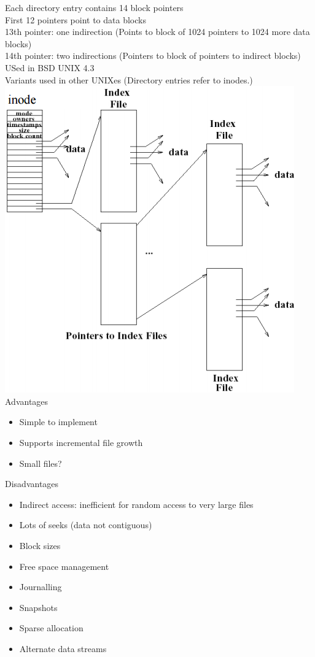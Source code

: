 \documentclass[number]{notes}
\begin{document}
\begin{landscape}
\begin{multicols}{3}
Each directory entry contains 14 block pointers\\
First 12 pointers point to data blocks\\
13th pointer: one indirection (Points to block of 1024 pointers to 1024 more data blocks)\\
14th pointer: two indirections (Pointers to block of pointers to indirect blocks)\\
USed in BSD UNIX 4.3\\
Variants used in other UNIXes (Directory entries refer to inodes.)\\
\includegraphics[width=\linewidth]{unixFS.png}
Advantages
\begin{itemize}[nolistsep]
    \item Simple to implement
    \item Supports incremental file growth
    \item Small files?
\end{itemize}
Disadvantages
\begin{itemize}[nolistsep]
    \item Indirect access: inefficient for random access to very large files
    \item Lots of seeks (data not contiguous)
\end{itemize}
\begin{itemize}[nolistsep]
    \item Block sizes
    \item Free space management
    \item Journalling
    \item Snapshots
    \item Sparse allocation
    \item Alternate data streams
\end{itemize}


\end{multicols}
\end{landscape}
\end{document}
